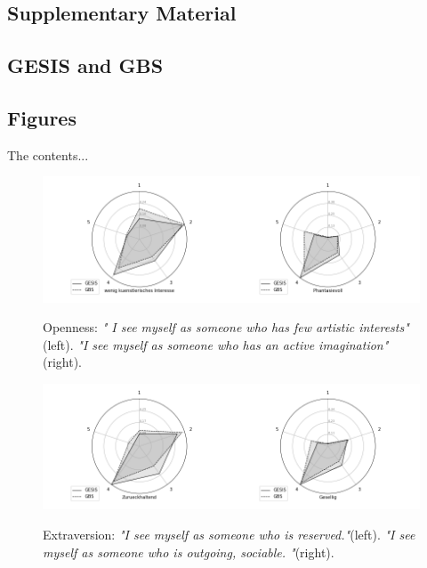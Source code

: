 
\begin{appendices}


\chapter{Supplementary Material}

\section{GESIS and GBS}

\section{Figures}
The contents...

                \begin{figure}[ht]
                \begin{center}
                   \includegraphics[scale=0.55,angle=0]{fig/Opennessfigure}
	         \label{Openness}
	         \caption{ Openness: \textit{" I see myself as someone who has few artistic interests"}(left). \textit{"I see myself as someone who has an active imagination"}(right).}
                \end{center}
                \end{figure}

                \begin{figure}[ht]
                \begin{center}
                   \includegraphics[scale=0.55,angle=0]{fig/Extraversionfigure}
	         \label{Extraversion}
	         \caption{Extraversion: \textit{"I see myself as someone who is reserved."}(left). \textit{"I see myself as someone who is outgoing, sociable. "}(right).}
                \end{center}
                \end{figure}


\end{appendices}
